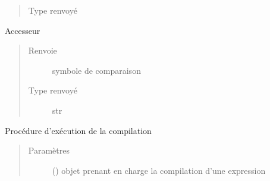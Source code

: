 \documentclass[letterpaper,10pt,french]{sphinxmanual}
\begin{document}
\begin{fulllineitems}
\begin{fulllineitems}
\begin{quote}
\begin{description}
\item[{Type renvoyé}] \leavevmode
{\hyperref[\detokenize{comparaisonexpressionnodes:comparaisonexpressionnodes.ComparaisonExpressionNode}]{}}

\end{description}\end{quote}

\end{fulllineitems}


\begin{fulllineitems}
\label{\detokenize{comparaisonexpressionnodes:comparaisonexpressionnodes.ComparaisonExpressionNode.comparaisonSymbol}}
Accesseur
\begin{quote}\begin{description}
\item[{Renvoie}] \leavevmode
symbole de comparaison

\item[{Type renvoyé}] \leavevmode
str

\end{description}\end{quote}

\end{fulllineitems}


\begin{fulllineitems}
\label{\detokenize{comparaisonexpressionnodes:comparaisonexpressionnodes.ComparaisonExpressionNode.compile}}
Procédure d’exécution de la compilation
\begin{quote}\begin{description}
\item[{Paramètres}] \leavevmode
{} ({\hyperref[\detokenize{compileexpressionmanager:compileexpressionmanager.CompileExpressionManager}]{}}) \textendash{} objet prenant en charge la compilation d’une expression


\end{description}
\end{quote}
\end{fulllineitems}
\end{fulllineitems}
\end{document}
